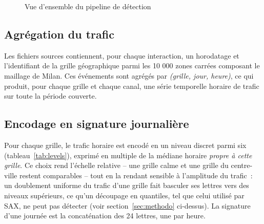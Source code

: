 \begin{figure}[htbp]
  \centering
  \caption{Vue d'ensemble du pipeline de détection}
  \label{fig:pipeline}
\end{figure}

\subsection{Agrégation du trafic}

Les fichiers sources contiennent, pour chaque interaction, un
horodatage et l'identifiant de la grille géographique parmi les
10 000 zones carrées composant le maillage de Milan. Ces événements
sont agrégés par \emph{(grille, jour, heure)}, ce qui produit, pour
chaque grille et chaque canal, une série temporelle horaire de trafic
sur toute la période couverte.

\subsection{Encodage en signature journalière}

Pour chaque grille, le trafic horaire est encodé en un niveau discret
parmi six (tableau~\ref{tab:levels}), exprimé en multiple de la
médiane horaire \emph{propre à cette grille}. Ce choix rend l'échelle
relative -- une grille calme et une grille du centre-ville restent
comparables -- tout en la rendant sensible à l'amplitude du trafic~:
un doublement uniforme du trafic d'une grille fait basculer ses
lettres vers des niveaux supérieurs, ce qu'un découpage en quantiles,
tel que celui utilisé par SAX, ne peut pas détecter (voir
section~\ref{sec:methodo} ci-dessus). La signature d'une journée est
la concaténation des 24 lettres, une par heure.

